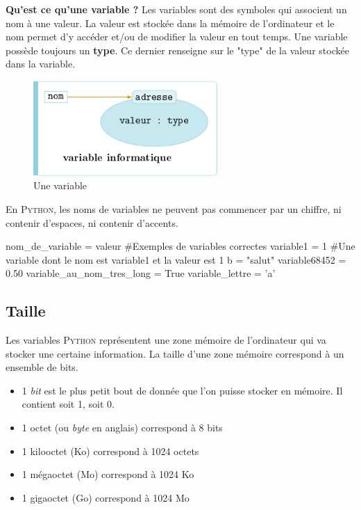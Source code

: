 \textbf{Qu'est ce qu'une variable ?} Les variables sont des symboles qui associent un nom à une valeur. La valeur est stockée dans la mémoire de l'ordinateur et le nom permet d'y accéder et/ou de modifier la valeur en tout temps. Une variable possède toujours un \textbf{type}. Ce dernier renseigne sur le "type" de la valeur stockée dans la variable. 

\begin{figure}[h!]
    \centering
    \includegraphics[width=7cm]{variable.png}
    \caption{Une variable}
    \label{variable}
\end{figure}

En \textsc{Python}, les noms de variables ne peuvent pas commencer par un chiffre, ni contenir d'espaces, ni contenir d'accents.

\begin{python}[caption = déclaration de variables]
nom_de_variable = valeur
#Exemples de variables correctes
variable1 = 1 #Une variable dont le nom est variable1 et la valeur est 1
b = "salut"
variable68452 = 0.50
variable_au_nom_tres_long = True
variable_lettre = 'a'
\end{python}


\subsection{Taille}

Les variables \textsc{Python} représentent une zone mémoire de l'ordinateur qui va stocker une certaine information. La taille d'une zone mémoire correspond à un ensemble de bits.

\begin{itemize}
    \item 1 \textit{bit} est le plus petit bout de donnée que l'on
    puisse stocker en mémoire. Il contient soit 1, soit 0.
    \item 1 octet (ou \textit{byte} en anglais) correspond à 8 bits
    \item 1 kilooctet (Ko) correspond à 1024 octets 
    \item 1 mégaoctet (Mo) correspond à 1024 Ko 
    \item 1 gigaoctet (Go) correspond à 1024 Mo 
\end{itemize}


